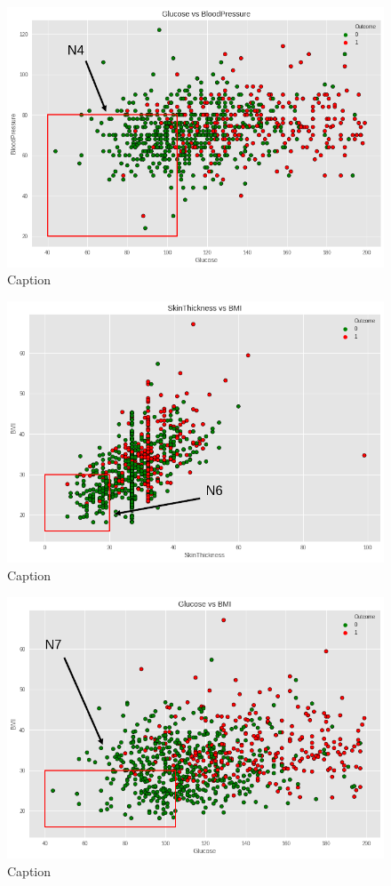 \documentclass[12pt]{article}
\begin{document}
\begin{figure}[ht]
\centering
\includegraphics[width=1\textwidth]{download(3).png}
\caption{\label{fig:20} Caption}
\end{figure}

\begin{figure}[ht]
\centering
\includegraphics[width=1\textwidth]{download(4).png}
\caption{\label{fig:21} Caption}
\end{figure}

\begin{figure}[ht]
\centering
\includegraphics[width=1\textwidth]{download(5).png}
\caption{\label{fig:22} Caption}
\end{figure}
\end{document}
